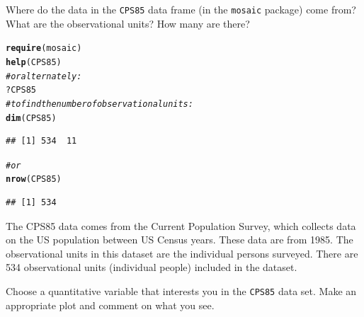 \documentclass[twoside]{book}\usepackage[]{graphicx}\usepackage[]{xcolor}
\makeatletter
\newcommand{\hlcom}[1]{\textcolor[rgb]{0.678,0.584,0.686}{\textit{#1}}}%
\newcommand{\hlopt}[1]{\textcolor[rgb]{0,0,0}{#1}}%
\newcommand{\hlstd}[1]{\textcolor[rgb]{0.345,0.345,0.345}{#1}}%
\newcommand{\hlkwd}[1]{\textcolor[rgb]{0.737,0.353,0.396}{\textbf{#1}}}%
\newenvironment{kframe}{%
 \def\at@end@of@kframe{}%
 \ifinner\ifhmode%
  \def\at@end@of@kframe{\end{minipage}}%
  \begin{minipage}{\columnwidth}%
 \fi\fi%
 \def\FrameCommand##1{\hskip\@totalleftmargin \hskip-\fboxsep
 \colorbox{shadecolor}{##1}\hskip-\fboxsep
     \hskip-\linewidth \hskip-\@totalleftmargin \hskip\columnwidth}%
 \MakeFramed {\advance\hsize-\width
   \@totalleftmargin\z@ \linewidth\hsize
   \@setminipage}}%
 {\par\unskip\endMakeFramed%
 \at@end@of@kframe}
\newenvironment{knitrout}{}{} %
\newcommand{\Rindex}[1]{\index{\texttt{#1}}}
\newcommand{\dataframe}[1]{{\color{blue!80!black}\texttt{#1}}\Rindex{#1}}
\newcommand{\pkg}[1]{{\color{red!80!black}\texttt{#1}}\Rindex{#1}}
\makeatother
\begin{document}
\begin{problem}
	Where do the data in the \dataframe{CPS85} data frame (in the 
	\pkg{mosaic} package) come from?  What are the observational 
	units?  How many are there?
\end{problem}

\begin{solution}
\begin{knitrout}
\color{fgcolor}\begin{kframe}
\begin{alltt}
\hlkwd{require}\hlstd{(mosaic)}
\hlkwd{help}\hlstd{(CPS85)}
\hlcom{# or alternately:}
\hlopt{?}\hlstd{CPS85}
\hlcom{#to find the number of observational units:}
\hlkwd{dim}\hlstd{(CPS85)}
\end{alltt}
\begin{verbatim}
## [1] 534  11
\end{verbatim}
\begin{alltt}
\hlcom{#or}
\hlkwd{nrow}\hlstd{(CPS85)}
\end{alltt}
\begin{verbatim}
## [1] 534
\end{verbatim}
\end{kframe}
\end{knitrout}
The CPS85 data comes from the Current Population Survey, which collects data on the US population between US Census years.  These data are from 1985. The observational units in this dataset are the individual persons surveyed.  There are 534 observational units (individual people) included in the dataset.
\end{solution}

\begin{problem}
	Choose a quantitative variable that interests you in the \dataframe{CPS85}
	data set.  Make an appropriate plot and comment on what you see.
\end{problem}
\end{document}

